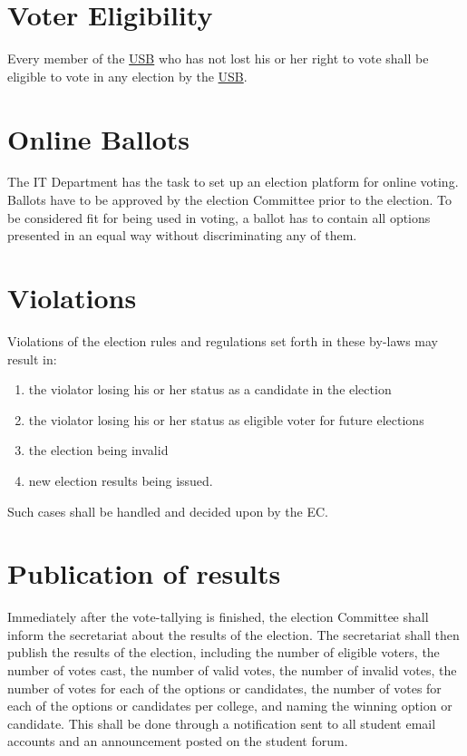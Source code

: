
\section{Voter Eligibility} 
Every member of the \hyperref[studentbody]{USB} who has not lost his or her right to vote shall be eligible to vote in any election by the \hyperref[studentbody]{USB}. 

\section{Online Ballots} 
The IT Department has the task to set up an election platform for online voting. Ballots have to be approved by the election Committee prior to the election. To be considered fit for being used in voting, a ballot has to contain all options presented in an equal way without discriminating any of them.

\section{Violations} 
Violations of the election rules and regulations set forth in these by-laws may result in:
\begin{enumerate}[nosep]
\item the violator losing his or her status as a candidate in the election
\item the violator losing his or her status as eligible voter for future elections
\item the election being invalid
\item new election results being issued.
\end{enumerate}
Such cases shall be handled and decided upon by the EC.

\section{Publication of results}
Immediately after the vote-tallying is finished, the election Committee shall inform the secretariat about the results of the election. The secretariat shall then publish the results of the election, including the number of eligible voters, the number of votes cast, the number of valid votes, the number of invalid votes, the number of votes for each of the options or candidates, the number of votes for each of the options or candidates per college, and naming the winning option or candidate. This shall be done through a notification sent to all student email accounts and an announcement posted on the student forum.

